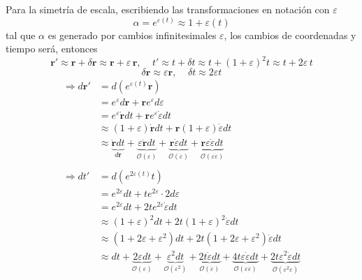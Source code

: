 \documentclass[]{article}
\numberwithin{equation}{section}
\newcommand{\0}{\textcolor{gray}{0}}
\newcommand{\rv}{\mathbf{r}}
\begin{document}
\begin{enumerate}
	Para la simetría de escala, escribiendo las transformaciones en notación con $\varepsilon$
	\begin{equation*}
		\alpha = e^{\varepsilon(t)} \approx 1 + \varepsilon(t)
	\end{equation*}
	tal que $\alpha$ es generado por cambios infinitesimales $\varepsilon$, los cambios de coordenadas y tiempo será, entonces
	\begin{equation*}
		\rv' \approx \rv + \delta \rv \approx \rv + \varepsilon \, \rv, ~~~~~ t' \approx t + \delta t \approx t + (1 + \varepsilon)^2 t \approx t + 2\varepsilon \, t
	\end{equation*}
	\begin{equation*}
		\delta \rv \approx \varepsilon \rv, ~~~~~ \delta t \approx 2\varepsilon t
	\end{equation*}
	\begin{align*}
		\Rightarrow d \rv' &= d \left(e^{\varepsilon(t)} \rv\right)\\
		&= e^{\varepsilon} d\rv + \rv e^{\varepsilon} d \varepsilon\\
		&= e^{\varepsilon} \dot{\rv} dt + \rv e^{\varepsilon} \dot{\varepsilon} dt \\
		&\approx (1 + \varepsilon) \dot{\rv} dt + \rv (1 + \varepsilon) \dot{\varepsilon} dt \\
		&\approx \underbrace{\dot{\rv} dt}_{d\rv} + \underbrace{\varepsilon \dot{\rv} dt}_{\mathcal{O}(\varepsilon)} + \underbrace{\rv \dot{\varepsilon} dt}_{\mathcal{O}(\dot{\varepsilon})} + \underbrace{\rv \varepsilon \dot{\varepsilon} dt}_{\mathcal{O}(\varepsilon \dot{\varepsilon})}\\
		&\\
		\Rightarrow d t' &= d \left(e^{2\varepsilon(t)} t\right)\\
		&= e^{2\varepsilon} dt + t e^{2\varepsilon} \cdot 2 d \varepsilon\\
		&= e^{2\varepsilon} dt + 2 t e^{2\varepsilon} \dot{\varepsilon} dt \\
		&\approx (1 + \varepsilon)^2 dt + 2 t (1 + \varepsilon)^2 \dot{\varepsilon} dt \\
		&\approx (1 + 2\varepsilon + \varepsilon^2) dt + 2 t (1 + 2\varepsilon + \varepsilon^2) \dot{\varepsilon} dt \\
		&\approx dt + \underbrace{2\varepsilon dt}_{\mathcal{O}(\varepsilon)} + \underbrace{\varepsilon^2 dt}_{\mathcal{O}(\varepsilon^2)} + \underbrace{2 t \dot{\varepsilon} dt}_{\mathcal{O}(\dot{\varepsilon})} + \underbrace{4 t \varepsilon \dot{\varepsilon} dt}_{\mathcal{O}(\varepsilon \dot{\varepsilon})} + \underbrace{2 t \varepsilon^2 \dot{\varepsilon} dt}_{\mathcal{O}(\varepsilon^2 \dot{\varepsilon})}

\end{align*}
\end{enumerate}
\end{document}
